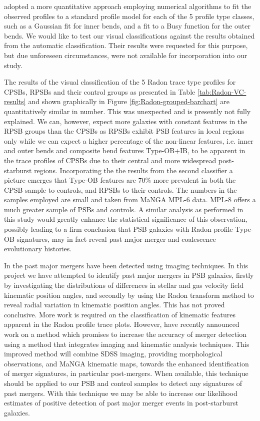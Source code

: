 \cite{2018MNRAS.480.2217S} adopted a more quantitative approach employing numerical algorithms to fit the observed profiles to a standard profile model for each of the 5 profile type classes, such as a Gaussian fit for inner bends, and a fit to a Busy function \citep{2014ascl.soft02015W} for the outer bends. We would like to test our visual classifications against the results obtained from the automatic classification. Their results were requested for this purpose, but due unforeseen circumstances, were not available for incorporation into our study.

The results of the visual classification of the 5 Radon trace type profiles for CPSBs, RPSBs and their control groups as presented in Table \ref{tab:Radon-VC-results} and shown graphically in Figure \ref{fig:Radon-grouped-barchart} are quantitatively similar in number. This was unexpected and is presently not fully explained. We can, however, expect more galaxies with constant features in the RPSB groups than the CPSBs as RPSBs exhibit PSB features in local regions only while we can expect a higher percentage of the non-linear features, i.e. inner and outer bends and composite bend features Type-OB+IB, to be apparent in the trace profiles of CPSBs due to their central and more widespread post-starburst regions. Incorporating the the results from the second classifier a picture emerges that Type-OB features are 70\% more prevalent in both the CPSB sample to controls, and RPSBs to their controls. The numbers in the samples employed are small and taken from MaNGA MPL-6 data. MPL-8 offers a much greater sample of PSBs and controls. A similar analysis as performed in this study would greatly enhance the statistical significance of this observation, possibly leading to a firm conclusion that PSB galaxies with Radon profile Type-OB signatures, may in fact reveal past major merger and coalescence evolutionary histories.

In the past major mergers have been detected using imaging techniques. In this project we have attempted to identify past major mergers in PSB galaxies, firstly by investigating the distributions of differences in stellar and gas velocity field kinematic position angles, and secondly by using the Radon transform method to reveal radial variation in kinematic position angles. This has not proved conclusive. More work is required on the classification of kinematic features apparent in the Radon profile trace plots. However, \cite{2019DDA....5020304N} have recently announced work on a method which promises to increase the accuracy of merger detection using a method that integrates imaging and kinematic analysis techniques. This improved method will combine SDSS imaging, providing morphological observations, and MaNGA  kinematic maps, towards the enhanced identification of merger signatures, in particular post-mergers. When available, this technique should be applied to our PSB and control samples to detect any signatures of past mergers. With this technique we may be able to increase our likelihood estimates of positive detection of past major merger events in post-starburst galaxies.